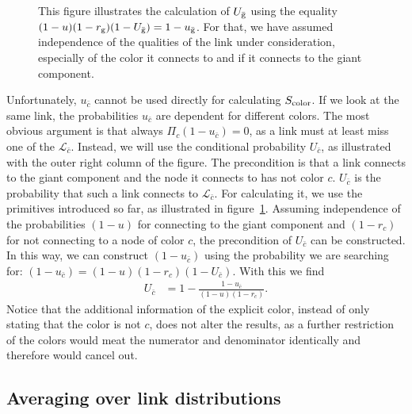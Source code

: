 \documentclass[aps, pre, onecolumn, a4paper, floatfix]{revtex4}
\begin{document}
\begin{figure}[htb]
\begin{minipage}[b]{0.2\linewidth}
\begin{center}
   \end{center}
  \end{minipage}
    \caption{This figure illustrates the calculation of $U_{\bar{\rm g}}$ 
    using the equality $(1-u)(1-r_{\rm g})(1-U_{\bar{\rm g}})=1-u_{\bar{\rm g}}$. For 
    that, we have assumed independence of the qualities of the link under 
    consideration, especially of the color it connects to and if it connects to 
    the giant component. }
    \label{fig:U_c}
\end{figure}
Unfortunately, $u_{\bar c}$ cannot be used directly for calculating $S_{\rm color}$. 
If we look at the same link, 
the probabilities $u_{\bar c}$ are dependent for different colors. 
The most obvious argument is that always $\Pi_c (1-u_{\bar c})=0$, 
as a link must at least miss one of the $\mathcal{L}_{\bar c}$. 
Instead, we will use the conditional probability $U_{\bar c}$, 
as illustrated with the outer right column of the figure. 
The precondition is that a link connects to the giant component 
and the node it connects to has not color $c$. 
$U_{\bar c}$ is the probability that such a link connects to $\mathcal{L}_{\bar c}$. 
For calculating it, we use the primitives introduced so far, 
as illustrated in figure~\ref{fig:U_c}. 
Assuming independence of the probabilities $(1-u)$ for connecting to the giant component 
and $(1-r_c)$ for not connecting to a node of color $c$, 
the precondition of $U_{\bar c}$ can be constructed. 
In this way, we can construct $(1-u_{\bar c})$ using the probability we are searching for: 
$(1-u_{\bar c}) = (1-u)(1-r_c)(1-U_{\bar c})$. With this we find  
\begin{align}
U_{\bar c} &= 1 - \frac{1-u_{\bar c}}{(1-u)(1-r_c)}.\label{eq:U_c}
\end{align}
Notice that the additional information of the explicit color, instead of only stating that the color 
is not $c$, does not alter the results, as a further restriction of the colors 
would meat the numerator and denominator identically and therefore would cancel out. 





\subsection{Averaging over link distributions}
\end{document}
